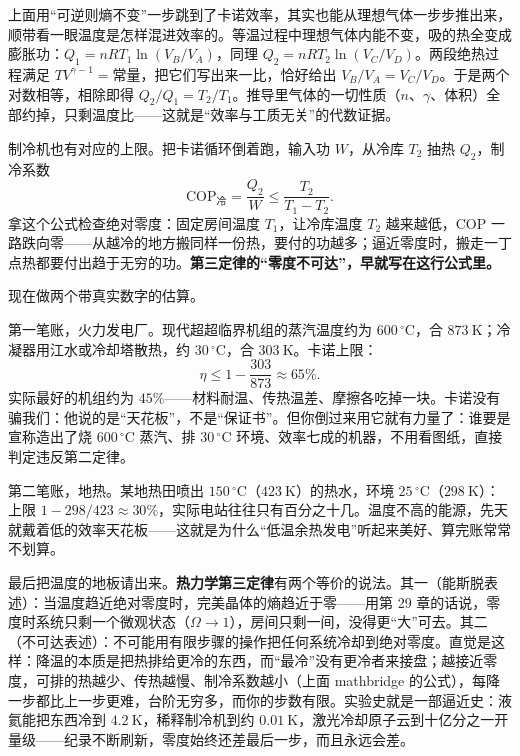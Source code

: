 \begin{mathbridge}
上面用“可逆则熵不变”一步跳到了卡诺效率，其实也能从理想气体一步步推出来，顺带看一眼温度是怎样混进效率的。等温过程中理想气体内能不变，吸的热全变成膨胀功：\(Q_1=nRT_1\ln(V_B/V_A)\)，同理 \(Q_2=nRT_2\ln(V_C/V_D)\)。两段绝热过程满足 \(T V^{\gamma-1}=\text{常量}\)，把它们写出来一比，恰好给出 \(V_B/V_A=V_C/V_D\)。于是两个对数相等，相除即得 \(Q_2/Q_1=T_2/T_1\)。推导里气体的一切性质（\(n\)、\(\gamma\)、体积）全部约掉，只剩温度比——这就是“效率与工质无关”的代数证据。

制冷机也有对应的上限。把卡诺循环倒着跑，输入功 \(W\)，从冷库 \(T_2\) 抽热 \(Q_2\)，制冷系数
\[
\mathrm{COP}_{\text{冷}}=\frac{Q_2}{W}\leq\frac{T_2}{T_1-T_2}.
\]
拿这个公式检查绝对零度：固定房间温度 \(T_1\)，让冷库温度 \(T_2\) 越来越低，COP 一路跌向零——从越冷的地方搬同样一份热，要付的功越多；逼近零度时，搬走一丁点热都要付出趋于无穷的功。\textbf{第三定律的“零度不可达”，早就写在这行公式里。}
\end{mathbridge}

现在做两个带真实数字的估算。

第一笔账，火力发电厂。现代超超临界机组的蒸汽温度约为 \(600\,^\circ\mathrm{C}\)，合 \(873\ \mathrm{K}\)；冷凝器用江水或冷却塔散热，约 \(30\,^\circ\mathrm{C}\)，合 \(303\ \mathrm{K}\)。卡诺上限：
\[
\eta\leq 1-\frac{303}{873}\approx 65\%.
\]
实际最好的机组约为 \(45\%\)——材料耐温、传热温差、摩擦各吃掉一块。卡诺没有骗我们：他说的是“天花板”，不是“保证书”。但你倒过来用它就有力量了：谁要是宣称造出了烧 \(600\,^\circ\mathrm{C}\) 蒸汽、排 \(30\,^\circ\mathrm{C}\) 环境、效率七成的机器，不用看图纸，直接判定违反第二定律。

第二笔账，地热。某地热田喷出 \(150\,^\circ\mathrm{C}\)（\(423\ \mathrm{K}\)）的热水，环境 \(25\,^\circ\mathrm{C}\)（\(298\ \mathrm{K}\)）：上限 \(1-298/423\approx 30\%\)，实际电站往往只有百分之十几。温度不高的能源，先天就戴着低的效率天花板——这就是为什么“低温余热发电”听起来美好、算完账常常不划算。

最后把温度的地板请出来。\textbf{热力学第三定律}有两个等价的说法。其一（能斯脱表述）：当温度趋近绝对零度时，完美晶体的熵趋近于零——用第 29 章的话说，零度时系统只剩一个微观状态（\(\Omega\to1\)），房间只剩一间，没得更“大”可去。其二（不可达表述）：不可能用有限步骤的操作把任何系统冷却到绝对零度。直觉是这样：降温的本质是把热排给更冷的东西，而“最冷”没有更冷者来接盘；越接近零度，可排的热越少、传热越慢、制冷系数越小（上面 mathbridge 的公式），每降一步都比上一步更难，台阶无穷多，而你的步数有限。实验史就是一部逼近史：液氦能把东西冷到 \(4.2\ \mathrm{K}\)，稀释制冷机到约 \(0.01\ \mathrm{K}\)，激光冷却原子云到十亿分之一开量级——纪录不断刷新，零度始终还差最后一步，而且永远会差。

